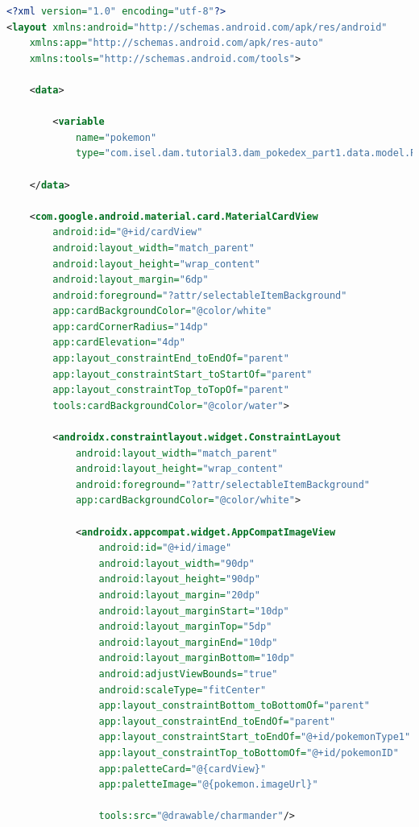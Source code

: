 \documentclass[a4paper, 12pt]{article}
\begin{document}
\begin{lstlisting}[caption={Binding property Region.}, label={code:binding_region_code}, language=XML]
    <?xml version="1.0" encoding="utf-8"?>
<layout xmlns:android="http://schemas.android.com/apk/res/android"
    xmlns:app="http://schemas.android.com/apk/res-auto"
    xmlns:tools="http://schemas.android.com/tools">

    <data>

        <variable
            name="pokemon"
            type="com.isel.dam.tutorial3.dam_pokedex_part1.data.model.Pokemon" />

    </data>

    <com.google.android.material.card.MaterialCardView
        android:id="@+id/cardView"
        android:layout_width="match_parent"
        android:layout_height="wrap_content"
        android:layout_margin="6dp"
        android:foreground="?attr/selectableItemBackground"
        app:cardBackgroundColor="@color/white"
        app:cardCornerRadius="14dp"
        app:cardElevation="4dp"
        app:layout_constraintEnd_toEndOf="parent"
        app:layout_constraintStart_toStartOf="parent"
        app:layout_constraintTop_toTopOf="parent"
        tools:cardBackgroundColor="@color/water">

        <androidx.constraintlayout.widget.ConstraintLayout
            android:layout_width="match_parent"
            android:layout_height="wrap_content"
            android:foreground="?attr/selectableItemBackground"
            app:cardBackgroundColor="@color/white">

            <androidx.appcompat.widget.AppCompatImageView
                android:id="@+id/image"
                android:layout_width="90dp"
                android:layout_height="90dp"
                android:layout_margin="20dp"
                android:layout_marginStart="10dp"
                android:layout_marginTop="5dp"
                android:layout_marginEnd="10dp"
                android:layout_marginBottom="10dp"
                android:adjustViewBounds="true"
                android:scaleType="fitCenter"
                app:layout_constraintBottom_toBottomOf="parent"
                app:layout_constraintEnd_toEndOf="parent"
                app:layout_constraintStart_toEndOf="@+id/pokemonType1"
                app:layout_constraintTop_toBottomOf="@+id/pokemonID"
                app:paletteCard="@{cardView}"
                app:paletteImage="@{pokemon.imageUrl}"

                tools:src="@drawable/charmander"/>


\end{lstlisting}
\end{document}
